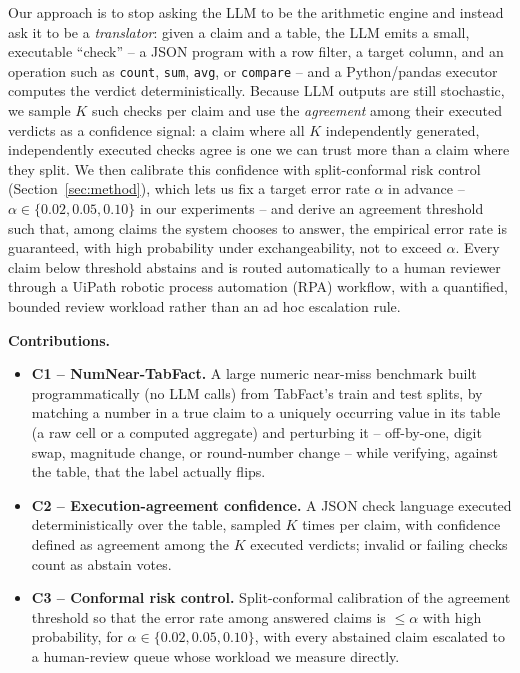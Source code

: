 \documentclass[journal]{IEEEtran}
\begin{document}
Our approach is to stop asking the LLM to be the arithmetic engine and
instead ask it to be a \emph{translator}: given a claim and a table, the LLM
emits a small, executable ``check'' -- a JSON program with a row filter, a
target column, and an operation such as \texttt{count}, \texttt{sum},
\texttt{avg}, or \texttt{compare} -- and a Python/pandas executor computes
the verdict deterministically. Because LLM outputs are still stochastic, we
sample $K$ such checks per claim and use the \emph{agreement} among their
executed verdicts as a confidence signal: a claim where all $K$ independently
generated, independently executed checks agree is one we can trust more than
a claim where they split. We then calibrate this confidence with
split-conformal risk control (Section~\ref{sec:method}), which lets us fix a
target error rate $\alpha$ in advance -- $\alpha\in\{0.02, 0.05, 0.10\}$ in
our experiments -- and derive an agreement threshold such that, among claims
the system chooses to answer, the empirical error rate is guaranteed, with
high probability under exchangeability, not to exceed $\alpha$. Every claim
below threshold abstains and is routed automatically to a human reviewer
through a UiPath robotic process automation (RPA) workflow, with a
quantified, bounded review workload rather than an ad hoc escalation rule.

\textbf{Contributions.}
\begin{itemize}
\item \textbf{C1 -- NumNear-TabFact.} A large numeric near-miss benchmark
built programmatically (no LLM calls) from TabFact's train and test splits,
by matching a number in a true claim to a uniquely occurring value in its
table (a raw cell or a computed aggregate) and perturbing it -- off-by-one,
digit swap, magnitude change, or round-number change -- while verifying,
against the table, that the label actually flips.
\item \textbf{C2 -- Execution-agreement confidence.} A JSON check language
executed deterministically over the table, sampled $K$ times per claim, with
confidence defined as agreement among the $K$ executed verdicts; invalid or
failing checks count as abstain votes.
\item \textbf{C3 -- Conformal risk control.} Split-conformal calibration of
the agreement threshold so that the error rate among answered claims is
$\leq\alpha$ with high probability, for $\alpha\in\{0.02,0.05,0.10\}$, with
every abstained claim escalated to a human-review queue whose workload we
measure directly.
\end{itemize}
\end{document}

